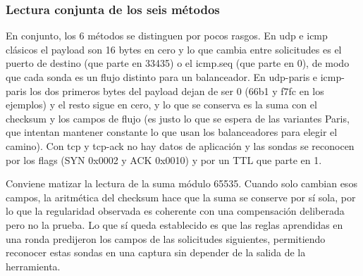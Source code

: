 \subsubsection{Lectura conjunta de los seis métodos}

En conjunto, los 6 métodos se distinguen por pocos rasgos. En udp e icmp clásicos el payload son 16 bytes en cero y lo que cambia entre solicitudes es el puerto de destino (que parte en 33435) o el icmp.seq (que parte en 0), de modo que cada sonda es un flujo distinto para un balanceador. En udp-paris e icmp-paris los dos primeros bytes del payload dejan de ser 0 (66b1 y f7fc en los ejemplos) y el resto sigue en cero, y lo que se conserva es la suma con el checksum y los campos de flujo (es justo lo que se espera de las variantes Paris, que intentan mantener constante lo que usan los balanceadores para elegir el camino). Con tcp y tcp-ack no hay datos de aplicación y las sondas se reconocen por los flags (SYN 0x0002 y ACK 0x0010) y por un TTL que parte en 1.

Conviene matizar la lectura de la suma módulo 65535. Cuando solo cambian esos campos, la aritmética del checksum hace que la suma se conserve por sí sola, por lo que la regularidad observada es coherente con una compensación deliberada pero no la prueba. Lo que sí queda establecido es que las reglas aprendidas en una ronda predijeron los campos de las solicitudes siguientes, permitiendo reconocer estas sondas en una captura sin depender de la salida de la herramienta.




